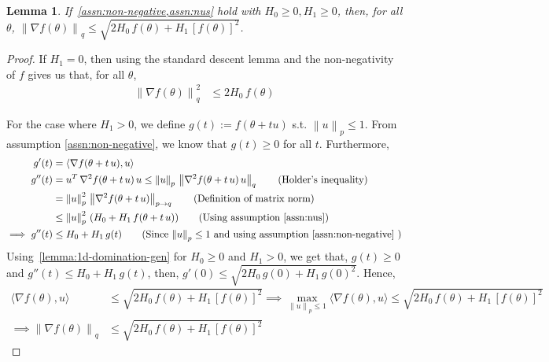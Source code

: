 \documentclass{article}
\newtheorem{lemma}{Lemma}
\newcommand{\normsq}[1]{\left\|#1 \right\|^{2}}
\newcommand{\norm}[1]{\left\|#1 \right\|}
\begin{document}
\begin{lemma}
If~\cref{assn:non-negative,assn:nus} hold with $H_0 \geq 0, H_1 \geq 0$, then, for all $\theta$, $\norm{\nabla f(\theta)}_{q} \leq \sqrt{2 H_0 \, f(\theta) + H_1 \, [f(\theta)]^2}$.
\label{lemma:nus-grad-gen}
\end{lemma}
\begin{proof}
If $H_1 = 0$, then using the standard descent lemma and the non-negativity of $f$ gives us that, for all $\theta$, 
\begin{align*}
\normsq{\nabla f(\theta)}_{q} & \leq 2 H_0 \, f(\theta)
\end{align*}

For the case where $H_1 > 0$, we define $g(t) := f(\theta + t u)$ s.t. $\norm{u}_p \leq 1$. From assumption \ref{assn:non-negative}, we know that $g(t) \geq 0$ for all $t$. Furthermore, 
\begin{align*}
g'(t) & = \langle \nabla f(\theta + t \, u), u \rangle \\
g''(t) &= u^T \, \nabla^2 f(\theta + t \, u) \, u \leq \norm{u}_{p} \, \norm{\nabla^2 f(\theta + t \, u) \, u}_{q} \tag{Holder's inequality} \\
& = \normsq{u}_p \, \norm{\nabla^2 f(\theta + t \, u)}_{p \to q} \tag{Definition of matrix norm} \\
& \leq \normsq{u}_p \, (H_0 + H_1 \, f(\theta + t \, u))  \tag{Using assumption \ref{assn:nus}} \\
\implies g''(t) & \leq H_0 + H_1 \, g(t) \tag{Since $\norm{u}_p \leq 1$ and using assumption \ref{assn:non-negative} }\\
\end{align*}
Using~\cref{lemma:1d-domination-gen} for $H_0 \geq 0$ and $H_1 > 0$, we get that, $g(t) \geq 0$ and $g''(t) \leq H_0 + H_1 \, g(t)$, then, $g'(0) \leq \sqrt{2 H_0 \, g(0) + H_1 \, g(0)^2}$. Hence, 
\begin{align*}
\langle \nabla f(\theta), u \rangle & \leq \sqrt{2 H_0 \, f(\theta) + H_1 \, [f(\theta)]^2} \implies \max_{\norm{u}_p \leq 1} \langle \nabla f(\theta), u \rangle \leq \sqrt{2 H_0 \, f(\theta) + H_1 \, [f(\theta)]^2} \\
\implies \norm{\nabla f(\theta)}_{q} & \leq \sqrt{2 H_0 \, f(\theta) + H_1 \, [f(\theta)]^2} \tag{By definition of the dual norm}
\end{align*}
\end{proof}
\end{document}
